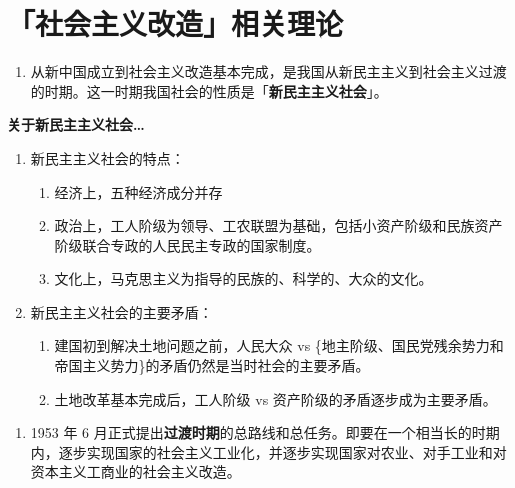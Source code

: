 \documentclass[UTF8]{ctexart}
\newcommand\Emph[2]{\colorbox{c#1-light}{\textcolor{c#1-emph}{\textbf{#2}}}}
\begin{document}
\newpage
{}
\BgThispage
\pagecolor{c3-med}
\section{「社会主义改造」相关理论}\label{sec:3}
\begin{enumerate}[start=1]
  \item 从新中国成立到社会主义改造基本完成，是我国从新民主主义到社会主义过渡的时期。这一时期我国社会的性质是「\Emph{3}{新民主主义社会}」。
\end{enumerate}

\begin{mybox}{3}
\textbf{关于新民主主义社会…}
\begin{enumerate}
  \item 新民主主义社会的特点：
  \begin{enumerate}[label={\roman{enumii})}]
    \item 经济上，五种经济成分并存
    \item 政治上，工人阶级为领导、工农联盟为基础，包括小资产阶级和民族资产阶级联合专政的人民民主专政的国家制度。
    \item 文化上，马克思主义为指导的民族的、科学的、大众的文化。
  \end{enumerate}
  \item 新民主主义社会的主要矛盾：
  \begin{enumerate}[label={\roman{enumii})}, start=1]
    \item 建国初到解决土地问题之前，人民大众 vs \{地主阶级、国民党残余势力和帝国主义势力\}的矛盾仍然是当时社会的主要矛盾。
    \item 土地改革基本完成后，工人阶级 vs 资产阶级的矛盾逐步成为主要矛盾。
  \end{enumerate}
\end{enumerate}
\end{mybox}

\begin{enumerate}[start=4]
  \item 1953 年 6 月正式提出\Emph{3}{过渡时期}的总路线和总任务。即要在一个相当长的时期内，逐步实现国家的社会主义工业化，并逐步实现国家对农业、对手工业和对资本主义工商业的社会主义改造。
\end{enumerate}
\end{document}
